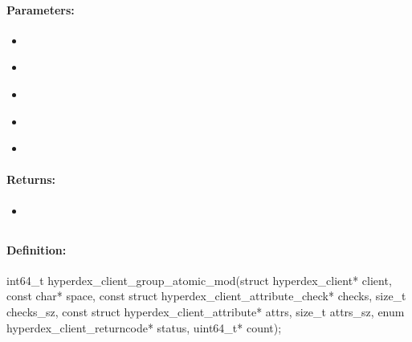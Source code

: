 \paragraph{Parameters:}
\begin{itemize}[noitemsep]
\item {}\\

\item {}\\

\item {}\\

\item {}\\

\item {}\\

\end{itemize}

\paragraph{Returns:}
\begin{itemize}[noitemsep]
\item {}\\

\end{itemize}

\pagebreak
\subsection{}
\label{api:c:group_atomic_mod}


\paragraph{Definition:}
\begin{ccode}
int64_t hyperdex_client_group_atomic_mod(struct hyperdex_client* client,
        const char* space,
        const struct hyperdex_client_attribute_check* checks, size_t checks_sz,
        const struct hyperdex_client_attribute* attrs, size_t attrs_sz,
        enum hyperdex_client_returncode* status,
        uint64_t* count);
\end{ccode}

